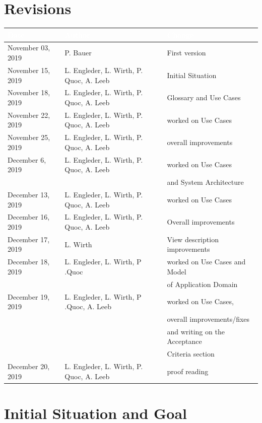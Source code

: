 \documentclass[12pt]{article}
\theoremstyle{definition}
\begin{document}
\section*{Revisions}
\begin{tabular}{|l|l|l|}
\hline
\cellcolor[gray]{0.5}\textcolor{white}{Date} & \cellcolor[gray]{0.5}\textcolor{white}{Author} & \cellcolor[gray]{0.5}\textcolor{white}{Change} \\ \hline
November 03, 2019&P. Bauer&First version \\ \hline
November 15, 2019&L. Engleder, L. Wirth, P. Quoc, A. Leeb & Initial Situation \\ \hline
November 18, 2019&L. Engleder, L. Wirth, P. Quoc, A. Leeb & Glossary and Use Cases \\ \hline
November 22, 2019&L. Engleder, L. Wirth, P. Quoc, A. Leeb & worked on Use Cases \\ \hline
November 25, 2019&L. Engleder, L. Wirth, P. Quoc, A. Leeb & overall improvements \\ \hline
December 6, 2019&L. Engleder, L. Wirth, P. Quoc, A. Leeb & worked on Use Cases \\ 
&& and System Architecture \\ \hline
December 13, 2019&L. Engleder, L. Wirth, P. Quoc, A. Leeb & worked on Use Cases \\ \hline
December 16, 2019&L. Engleder, L. Wirth, P. Quoc, A. Leeb & Overall improvements \\ \hline
December 17, 2019&L. Wirth & View description improvements \\ \hline
December 18, 2019&L. Engleder, L. Wirth, P .Quoc & worked on Use Cases and Model \\
&& of Application Domain \\ \hline
December 19, 2019&L. Engleder, L. Wirth, P .Quoc, A. Leeb & worked on Use Cases, \\
&& overall improvements/fixes \\
&& and writing on the Acceptance \\
&& Criteria section \\ \hline
December 20, 2019&L. Engleder, L. Wirth, P. Quoc, A. Leeb & proof reading \\ \hline

\end{tabular}
\pagebreak

\listoffigures
\pagebreak

\tableofcontents
\pagebreak

\section{Initial Situation and Goal}
\end{document}
